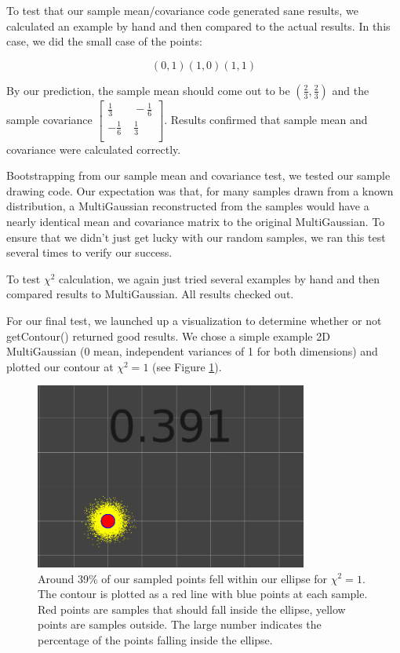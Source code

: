 \documentclass[12pt]{article}
\begin{document}
To test that our sample mean/covariance code generated sane results,
we calculated an example by hand and then compared to the actual results.
In this case, we did the small case of the points:

\[(0,1) (1,0) (1,1)\]

By our prediction, the sample mean should come out to be $(\frac{2}{3}, \frac{2}{3})$
and the sample covariance
$\left[ {\begin{smallmatrix}
\frac{1}{3} & \;-\frac{1}{6} \\
-\frac{1}{6} & \;\frac{1}{3} \\
\end{smallmatrix} } \right]$.
Results confirmed that sample mean and covariance were calculated correctly.

Bootstrapping from our sample mean and covariance test, we tested our sample
drawing code. Our expectation was that, for many samples drawn from a known
distribution, a MultiGaussian reconstructed from the samples would have a
nearly identical mean and covariance matrix to the original MultiGaussian.
To ensure that we didn't just get lucky with our random samples, we ran
this test several times to verify our success.

To test $\chi^{2}$ calculation, we again just tried several examples by hand and
then compared results to MultiGaussian. All results checked out.

For our final test, we launched up a visualization to determine whether or not
getContour() returned good results. We chose a simple example 2D MultiGaussian
(0 mean, independent variances of 1 for both dimensions) and plotted our contour
at $\chi^{2} = 1$ (see Figure \ref{fig:multigaussian}).

\begin{figure}
\centering
\includegraphics[width=0.8\textwidth]{figures/MultiGaussian_1_sigma.png}
\caption{Around 39\% of our sampled points fell within our ellipse for $\chi^{2} = 1$.
The contour is plotted as a red line with blue points at each sample. Red points are
samples that should fall inside the ellipse, yellow points are samples outside. The
large number indicates the percentage of the points falling inside the ellipse.}
\label{fig:multigaussian}
\end{figure}
\end{document}
